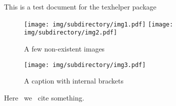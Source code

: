\documentclass[12pt]{article}
\begin{document}
This is a test document for the texhelper package


\begin{figure}[hbtp]
  \begin{center}
    \texttt{[image: img/subdirectory/img1.pdf]}
    \texttt{[image: img/subdirectory/img2.pdf]}
    \caption{A few non-existent images}
    \label{fig:thefirstfigure}
  \end{center}
\end{figure}

\begin{figure}[hbtp]
  \begin{center}
    \texttt{[image: img/subdirectory/img3.pdf]}
    \caption{A caption { with internal } brackets}
    \label{fig:thesecondfigure}
  \end{center}
\end{figure}

Here~\cite{author1:code1} we~\cite{author2:code2} cite something.~\cite{author3:code3}
\end{document}
